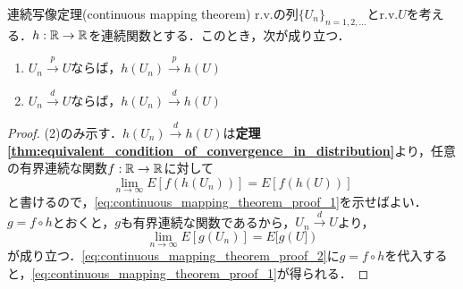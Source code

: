\documentclass[main.tex]{subfiles}
\begin{document}
\begin{myproposition}{連続写像定理(continuous mapping theorem)}
\label{prop:continuous_mapping_theorem} %
  r.v.の列$\{U_n\}_{n=1,2,\dots}$とr.v.$U$を考える．$h: \mathbb{R} \to \mathbb{R}$を連続関数とする．このとき，次が成り立つ．
  \begin{enumerate}[label=(\arabic*)]
    \item $U_n \xrightarrow{p} U$ならば，$h(U_n) \xrightarrow{p} h(U)$
    \item $U_n \xrightarrow{d} U$ならば，$h(U_n) \xrightarrow{d} h(U)$
  \end{enumerate}
\end{myproposition}
\begin{proof}
(2)のみ示す．$h(U_n) \xrightarrow{d} h(U)$は\textbf{定理 \ref{thm:equivalent_condition_of_convergence_in_distribution}}より，任意の有界連続な関数$f: \mathbb{R} \to \mathbb{R}$に対して
\begin{equation}
  \lim_{n \to \infty} E[f(h(U_n))] = E[f(h(U))]
  \label{eq:continuous_mapping_theorem_proof_1}
\end{equation}
と書けるので，\eqref{eq:continuous_mapping_theorem_proof_1}を示せばよい．$g = f \circ h$とおくと，$g$も有界連続な関数であるから，$U_n \xrightarrow{d} U$より，
\begin{equation}
  \lim_{n \to \infty} E[g(U_n)] = E[g(U])
  \label{eq:continuous_mapping_theorem_proof_2}
\end{equation}
が成り立つ．\eqref{eq:continuous_mapping_theorem_proof_2}に$g = f \circ h$を代入すると，\eqref{eq:continuous_mapping_theorem_proof_1}が得られる．

\end{proof}
\end{document}
